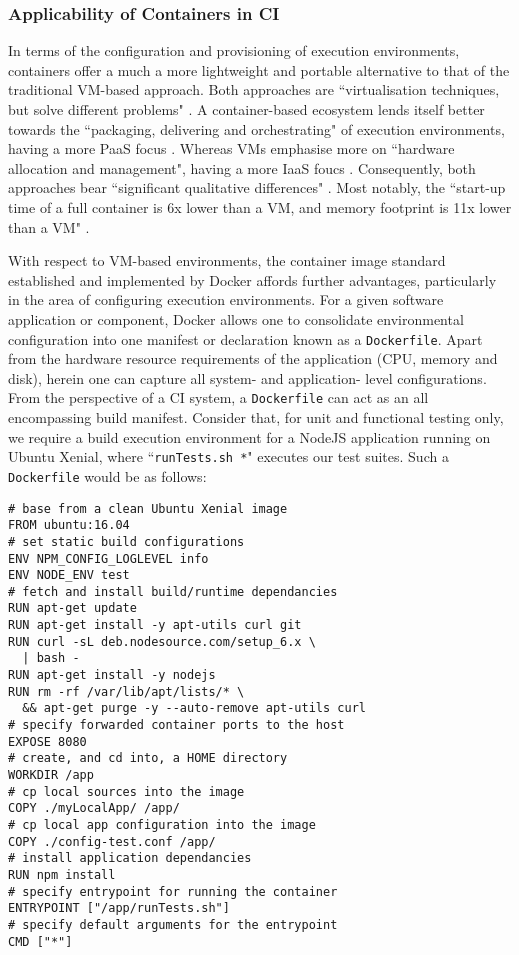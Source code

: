 \documentclass{report}
\begin{document}
\subsubsection{Applicability of Containers in CI}
In terms of the configuration and provisioning of execution environments, containers  
offer a much a more lightweight and portable alternative to that of the traditional VM-based approach.
Both approaches are ``virtualisation
techniques, but solve different problems" \citep{Claus}. A container-based ecosystem lends itself better 
towards the ``packaging, delivering and orchestrating" of execution environments, having
a more PaaS focus \citep{Claus}. Whereas VMs emphasise more on ``hardware allocation and management",
having a more IaaS foucs \citep{Claus}. Consequently, both approaches bear
``significant qualitative differences" \citep{Agarwal}. Most notably, the ``start-up time of a full container is 6x lower than a
VM, and memory footprint is 11x lower than a VM" \citep{Agarwal}.
\par
With respect to VM-based environments, the container image standard established and implemented by Docker affords 
further advantages, particularly in the area of configuring execution environments.   
For a given software application or component, Docker allows
one to consolidate environmental configuration
into one manifest or declaration known as a \texttt{Dockerfile}. 
Apart from the hardware resource requirements of the application (CPU, memory and disk), 
herein one can capture all system- and application- level configurations. 
From the perspective of a CI system, a  \texttt{Dockerfile} can
act as an all encompassing build manifest. Consider that, 
for unit and functional testing only, we require a build execution environment
for a NodeJS application running on Ubuntu Xenial, where ``\texttt{runTests.sh *}" executes our test suites.
Such a \texttt{Dockerfile} would be as follows:
\begin{verbatim}
# base from a clean Ubuntu Xenial image
FROM ubuntu:16.04
# set static build configurations
ENV NPM_CONFIG_LOGLEVEL info
ENV NODE_ENV test
# fetch and install build/runtime dependancies
RUN apt-get update
RUN apt-get install -y apt-utils curl git
RUN curl -sL deb.nodesource.com/setup_6.x \
  | bash -
RUN apt-get install -y nodejs 
RUN rm -rf /var/lib/apt/lists/* \
  && apt-get purge -y --auto-remove apt-utils curl
# specify forwarded container ports to the host
EXPOSE 8080
# create, and cd into, a HOME directory
WORKDIR /app
# cp local sources into the image
COPY ./myLocalApp/ /app/
# cp local app configuration into the image
COPY ./config-test.conf /app/
# install application dependancies
RUN npm install
# specify entrypoint for running the container 
ENTRYPOINT ["/app/runTests.sh"]
# specify default arguments for the entrypoint
CMD ["*"]
\end{verbatim}
\end{document}
